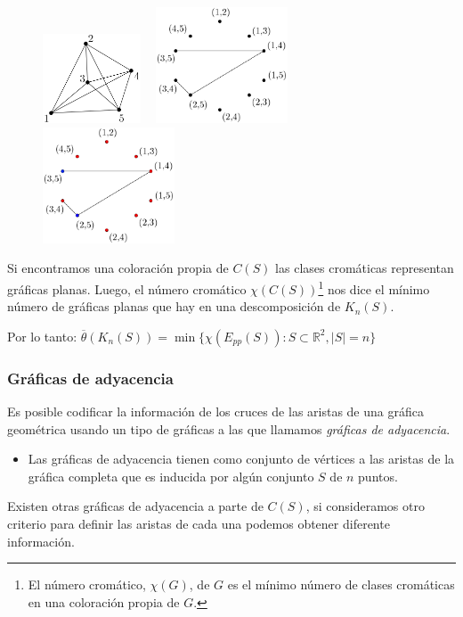 \begin{frame}
\begin{figure}
	\centering
	\includegraphics[width=0.26\textwidth]{images/K5}%
	~\vrule
	\includegraphics[width=0.35\textwidth]{images/EppK5}
	~\vrule
	\includegraphics[width=0.35\textwidth]{images/EppK5_colored}
\end{figure}
Si encontramos una coloración propia de $C(S)$ las clases cromáticas representan gráficas planas. Luego, el número cromático $\chi(C(S))$\let\thefootnote\relax\footnote{El número cromático, $\chi(G)$, de $G$ es el mínimo número de clases cromáticas en una coloración propia de $G$.} nos dice el mínimo número de gráficas planas que hay en una descomposición de $K_n(S)$.

Por lo tanto: $\overline{\theta}(K_n(S)) = \min\{\chi(E_{pp}(S)) : S \subset \mathbb{R}^2, |S| = n\}$
\end{frame}

\begin{frame}\frametitle{Gráficas de adyacencia}
Es posible codificar la información de los cruces de las aristas de una gráfica geométrica usando un tipo de gráficas a las que llamamos \emph{gráficas de adyacencia}.

\begin{itemize}
	\item Las gráficas de adyacencia tienen como conjunto de vértices a las aristas de la gráfica completa que es inducida por algún conjunto $S$ de $n$ puntos.
\end{itemize}

	Existen otras gráficas de adyacencia a parte de $C(S)$, si consideramos otro criterio para definir las aristas de cada una podemos obtener diferente información.
\end{frame}

